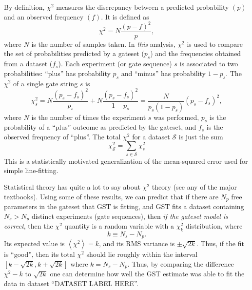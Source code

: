 \documentclass{article}[11pt]
\newcommand{\expec}[1]{\ensuremath{\left\langle#1\right\rangle}}
\newcommand{\putfield}[2]{#2}
\begin{document}
By definition, $\chi^2$ measures the discrepancy between a predicted probability $(p)$ and an observed frequency $(f)$.  It is defined as
\begin{equation}
\chi^2 = N\frac{(p-f)^2}{p},
\end{equation}
where $N$ is the number of samples taken.  In \emph{this} analysis, $\chi^2$ is used to compare the set of probabilities predicted by a gateset ($p_s$) and the frequencies obtained from a dataset ($f_s$).  Each experiment (or gate sequence) $s$ is associated to two probabilities:  ``plus'' has probability $p_s$ and ``minus'' has probability $1-p_s$.  The $\chi^2$ of a single gate string $s$ is
\begin{equation}
\chi^2_s = N\frac{(p_s-f_s)^2}{p_s} + N\frac{(p_s-f_s)^2}{1-p_s} = \frac{N}{p_s(1-p_s)}(p_s-f_s)^2,\label{eqGateStringChi2}
\end{equation}
where $N$ is the number of times the experiment $s$ was performed, $p_s$ is the probability of a ``plus'' outcome as predicted by the gateset, and $f_s$ is the observed frequency of ``plus''.  The total $\chi^2$ for a dataset $\mathcal{S}$ is just the sum 
\begin{equation}
\chi^2_\mathcal{S} = \sum_{s\in\mathcal{S}}{ \chi^2_s}
\end{equation}
This is a statistically motivated generalization of the mean-squared error used for simple line-fitting.

Statistical theory has quite a lot to say about $\chi^2$ theory (see any of the major textbooks).  Using some of these results, we can predict that if there are $N_p$ free parameters in the gateset that GST is fitting, and GST fits a dataset containing $N_s > N_p$ distinct experiments (gate sequences), then \emph{if the gateset model is correct}, then the $\chi^2$ quantity is a random variable with a $\chi^2_{k}$ distribution, where
$$k \equiv N_s - N_p.$$
Its expected value is $\expec{\chi^2}=k$, and its RMS variance is $\pm\sqrt{2k}$.  Thus, if the fit is ``good'', then its total $\chi^2$ should lie roughly within the interval $[k-\sqrt{2k},k+\sqrt{2k}]$ where $k = N_s-N_p$. 
Thus, by comparing the difference $\chi^2 - k$ to $\sqrt{2k}$ one can determine how well the GST estimate was able to fit the data in dataset ``\putfield{datasetLabel}{DATASET LABEL HERE}''.
\end{document}
